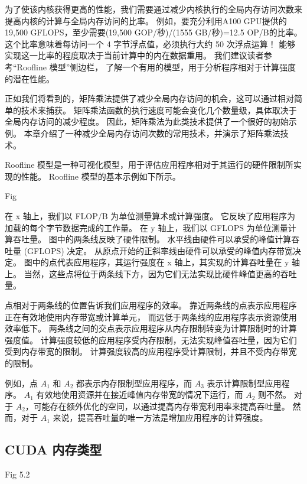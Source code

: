 为了使该内核获得更高的性能，我们需要通过减少内核执行的全局内存访问次数来提高内核的计算与全局内存访问的比率。 
例如，要充分利用A100 GPU提供的19,500 GFLOPS，至少需要(19,500 GOP/秒)/(1555 GB/秒)=12.5 OP/B的比率。 
这个比率意味着每访问一个 4 字节浮点值，必须执行大约 50 次浮点运算！ 
能够实现这一比率的程度取决于当前计算中的内在数据重用。 我们建议读者参考“Roofline 模型”侧边栏，
了解一个有用的模型，用于分析程序相对于计算强度的潜在性能。

正如我们将看到的，矩阵乘法提供了减少全局内存访问的机会，这可以通过相对简单的技术来捕获。 
矩阵乘法函数的执行速度可能会变化几个数量级，具体取决于全局内存访问的减少程度。 
因此，矩阵乘法为此类技术提供了一个很好的初始示例。 本章介绍了一种减少全局内存访问次数的常用技术，并演示了矩阵乘法技术。

\begin{remark}[Roofline 模型]
Roofline 模型是一种可视化模型，用于评估应用程序相对于其运行的硬件限制所实现的性能。 
Roofline 模型的基本示例如下所示。

{\color{red} Fig}

在 x 轴上，我们以 FLOP/B 为单位测量算术或计算强度。 它反映了应用程序为加载的每个字节数据完成的工作量。 
在 y 轴上，我们以 GFLOPS 为单位测量计算吞吐量。 图中的两条线反映了硬件限制。 
水平线由硬件可以承受的峰值计算吞吐量 (GFLOPS) 决定。 从原点开始的正斜率线由硬件可以承受的峰值内存带宽决定。 
图中的点代表应用程序，其运行强度在 x 轴上，其实现的计算吞吐量在 y 轴上。 
当然，这些点将位于两条线下方，因为它们无法实现比硬件峰值更高的吞吐量。

点相对于两条线的位置告诉我们应用程序的效率。 靠近两条线的点表示应用程序正在有效地使用内存带宽或计算单元，
而远低于两条线的应用程序表示资源使用效率低下。 两条线之间的交点表示应用程序从内存限制转变为计算限制时的计算强度值。 
计算强度较低的应用程序受内存限制，无法实现峰值吞吐量，因为它们受到内存带宽的限制。 
计算强度较高的应用程序受计算限制，并且不受内存带宽的限制。

例如，点 $A_1$ 和 $A_2$ 都表示内存限制型应用程序，而 $A_3$ 表示计算限制型应用程序。 
$A_1$ 有效地使用资源并在接近峰值内存带宽的情况下运行，而 $A_2$ 则不然。 
对于 $A_2$，可能存在额外优化的空间，以通过提高内存带宽利用率来提高吞吐量。 
然而，对于 $A_1$ 来说，提高吞吐量的唯一方法是增加应用程序的计算强度。
\end{remark}

\subsection{CUDA 内存类型}
{\color{red} Fig 5.2}

